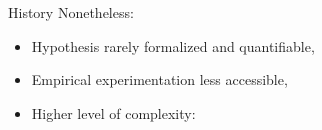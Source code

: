 \documentclass[12pt, notes=show]{beamer}
\begin{document}
\begin{frame}{History}
    Nonetheless:
    \begin{itemize}
	\item<2-> Hypothesis rarely formalized and quantifiable, 
	\item<3-> Empirical experimentation less accessible,
	\item<4-> Higher level of complexity:
    \end{itemize}
\end{frame}
\end{document}
